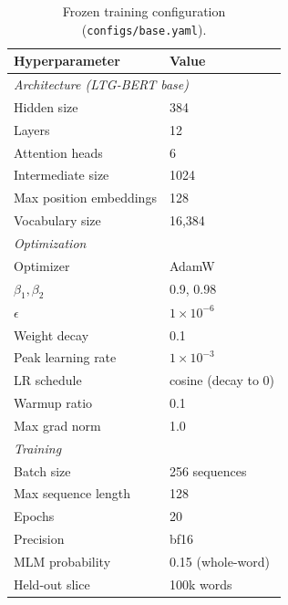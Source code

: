 \documentclass[11pt]{article}
\begin{document}
\begin{table}[h]
  \centering
  \small
  \begin{tabular}{ll}
    \toprule
    Hyperparameter & Value \\
    \midrule
    \multicolumn{2}{l}{\emph{Architecture (LTG-BERT base)}} \\
    Hidden size              & 384 \\
    Layers                   & 12 \\
    Attention heads          & 6 \\
    Intermediate size        & 1024 \\
    Max position embeddings  & 128 \\
    Vocabulary size          & 16{,}384 \\
    \midrule
    \multicolumn{2}{l}{\emph{Optimization}} \\
    Optimizer                & AdamW \\
    $\beta_1, \beta_2$       & 0.9, 0.98 \\
    $\epsilon$               & $1\times10^{-6}$ \\
    Weight decay             & 0.1 \\
    Peak learning rate       & $1\times10^{-3}$ \\
    LR schedule              & cosine (decay to 0) \\
    Warmup ratio             & 0.1 \\
    Max grad norm            & 1.0 \\
    \midrule
    \multicolumn{2}{l}{\emph{Training}} \\
    Batch size               & 256 sequences \\
    Max sequence length      & 128 \\
    Epochs                   & 20 \\
    Precision                & bf16 \\
    MLM probability          & 0.15 (whole-word) \\
    Held-out slice           & 100k words \\
    \bottomrule
  \end{tabular}
  \caption{Frozen training configuration (\texttt{configs/base.yaml}).}
  \label{tab:hyperparams}
\end{table}

\end{document}
